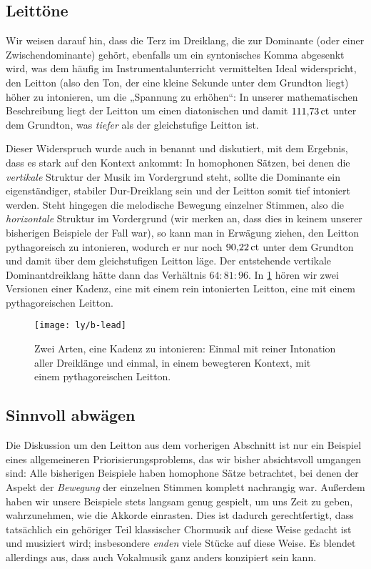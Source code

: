 \subsection{Leittöne}
\label{sec:ln}

Wir weisen darauf hin, dass die Terz im Dreiklang, die zur Dominante (oder einer
Zwischendominante) gehört, ebenfalls um ein syntonisches Komma abgesenkt wird,
was dem häufig im Instrumentalunterricht vermittelten Ideal widerspricht, den
Leitton (also den Ton, der eine kleine Sekunde unter dem Grundton liegt) höher
zu intonieren, um die „Spannung zu erhöhen“: In unserer mathematischen
Beschreibung liegt der Leitton um einen diatonischen  und damit
$111{,}73\,\text{ct}$ unter dem Grundton, was \emph{tiefer} als der gleichstufige
Leitton ist.

Dieser Widerspruch wurde auch in \cite[211]{viitasaari} benannt und
diskutiert, mit dem Ergebnis, dass es stark auf den Kontext ankommt: In
homophonen Sätzen, bei denen die \emph{vertikale} Struktur der Musik im
Vordergrund steht, sollte die Dominante ein eigenständiger, stabiler
Dur-Dreiklang sein und der Leitton somit tief intoniert werden. Steht hingegen
die melodische Bewegung einzelner Stimmen, also die \emph{horizontale} Struktur
im Vordergrund (wir merken an, dass dies in keinem unserer bisherigen Beispiele
der Fall war), so kann man in Erwägung ziehen, den Leitton pythagoreisch zu
intonieren, wodurch er nur noch $90{,}22\,\text{ct}$ unter dem Grundton und damit über
dem gleichstufigen Leitton läge. Der entstehende vertikale Dominantdreiklang
hätte dann das Verhältnis $64:81:96$. In \cref{fig:lead} hören wir zwei
Versionen einer Kadenz, eine mit einem rein intonierten Leitton, eine mit einem
pythagoreischen Leitton.

\begin{figure}
  \centering
  \texttt{[image: ly/b-lead]}
  \caption{Zwei Arten, eine Kadenz zu intonieren: Einmal mit reiner
    Intonation aller Dreiklänge und einmal, in einem bewegteren Kontext, mit
    einem pythagoreischen Leitton.}\label{fig:lead}
\end{figure}

\subsection{Sinnvoll abwägen}

Die Diskussion um den Leitton aus dem vorherigen Abschnitt ist nur ein Beispiel
eines allgemeineren Priorisierungsproblems, das wir bisher absichtsvoll umgangen
sind: Alle bisherigen Beispiele haben homophone Sätze betrachtet, bei denen der
Aspekt der \emph{Bewegung} der einzelnen Stimmen komplett nachrangig
war. Außerdem haben wir unsere Beispiele stets langsam genug gespielt, um uns
Zeit zu geben, wahrzunehmen, wie die Akkorde einrasten. Dies ist dadurch
gerechtfertigt, dass tatsächlich ein gehöriger Teil klassischer Chormusik auf
diese Weise gedacht ist und musiziert wird; insbesondere \emph{enden} viele
Stücke auf diese Weise. Es blendet allerdings aus, dass auch Vokalmusik ganz
anders konzipiert sein kann.

